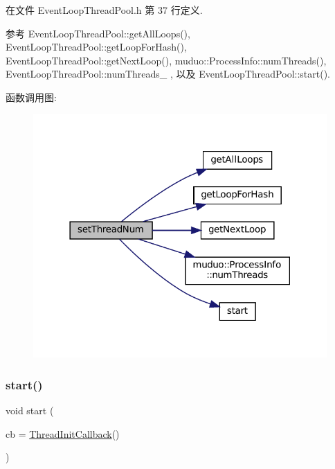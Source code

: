 在文件 Event\+Loop\+Thread\+Pool.\+h 第 37 行定义.



参考 Event\+Loop\+Thread\+Pool\+::get\+All\+Loops(), Event\+Loop\+Thread\+Pool\+::get\+Loop\+For\+Hash(), Event\+Loop\+Thread\+Pool\+::get\+Next\+Loop(), muduo\+::\+Process\+Info\+::num\+Threads(), Event\+Loop\+Thread\+Pool\+::num\+Threads\+\_\+ , 以及 Event\+Loop\+Thread\+Pool\+::start().

函数调用图\+:
\nopagebreak
\begin{figure}[H]
\begin{center}
\leavevmode
\includegraphics[width=318pt]{classmuduo_1_1net_1_1EventLoopThreadPool_a83bb28d139df96ba9fc449b4643f2c36_cgraph}
\end{center}
\end{figure}
\mbox{\label{classmuduo_1_1net_1_1EventLoopThreadPool_a5fe387a4a4b327ac5ab2c563169cfdea}} 
\subsubsection{\texorpdfstring{start()}{start()}}
{\footnotesize\ttfamily void start (\begin{DoxyParamCaption}\item[{const \hyperlink{classmuduo_1_1net_1_1EventLoopThreadPool_a4665880f4633f1e7d95fd6fef6811717}{Thread\+Init\+Callback} \&}]{cb = {\ttfamily \hyperlink{classmuduo_1_1net_1_1EventLoopThreadPool_a4665880f4633f1e7d95fd6fef6811717}{Thread\+Init\+Callback}()} }\end{DoxyParamCaption})}




